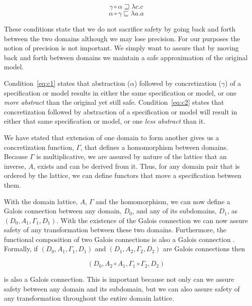 \documentclass[12pt]{article}
\begin{document}
\vspace{-\bigskipamount}
\begin{equation}
\label{eq:c1}
\gamma \circ \alpha \sqsupseteq \lambda c.c
\end{equation}
\begin{equation}
\label{eq:c2}
\alpha \circ \gamma \sqsubseteq \lambda a.a
\end{equation}

\noindent These conditions state that we do not sacrifice safety by going back and forth
between the two domains although we may lose precision.  For our purposes the notion of
precision is not important.  We simply want to assure that by moving back and forth
between domains we maintain a safe approximation of the original model.

Condition~\ref{eq:c1} states that abstraction ($\alpha$) followed by concretization
($\gamma$) of a specification or model results in either the same specification or model,
or one \emph{more abstract} than the original yet still safe.  Condition~\ref{eq:c2}
states that concretization followed by abstraction of a specification or model will result
in either that same specification or model, or one \emph{less abstract} than it.

We have stated that extension of one domain to form another gives us a concretization
function, $\Gamma$, that defines a homomorphism between domains.  Because $\Gamma$ is
multiplicative, we are assured by nature of the lattice that an inverse, $A$, exists and
can be derived from it.  Thus, for any domain pair that is ordered by the lattice, we can
define functors that move a specification between them.

With the domain lattice, $A$, $\Gamma$ and the homomorphism, we can now define a Galois
connection between any domain, $D_0$, and any of its subdomains, $D_1$, as
$(D_0,A_1,\Gamma_1,D_1)$.  With the existence of the Galois connection we can now assure
safety of any transformation between these two domains.  Furthermore, the functional
composition of two Galois connections is also a Galois connection
\cite{Nielson:05:Principles-of-P}. Formally, if $(D_0, A_1, \Gamma_1, D_1)$ and $(D_1,
A_2, \Gamma_2,D_2)$ are Galois connections then

\[(D_0, A_2 \circ A_1, \Gamma_1 \circ \Gamma_2, D_2)\]

\noindent is also a Galois connection.  This is important because not only can we assure
safety between any domain and its subdomain, but we can also assure safety of any
transformation throughout the entire domain lattice.
\end{document}
